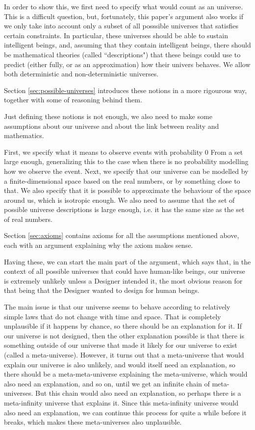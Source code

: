 \documentclass[a4paper
]{article}
\newcommand{\ghilimele}[1]{``#1"}
\begin{document}
In order to show this, we first need to specify what would count as an universe.
This is a difficult question, but, fortunately, this paper's argument also works
if we only take into account only a subset of all posssible universes that
satisfies certain constraints.
In particular, these universes should be able to sustain intelligent beings,
and, assuming that they contain intelligent beings, there should be mathematical
theories (called \ghilimele{descriptions}) that these beings could use to predict
(either fully, or as an approximation) how their univers behaves.
We allow both deterministic and non-deterministic universes.

Section \ref{sec:possible-universes} introduces these notions in a more
rigourous way, together with some of reasoning behind them.

Just defining these notions is not enough,
we also need to make some assumptions about our universe and about
the link between reality and mathematics.

First, we specify what it means to observe events with probability $0$ From
a set large enough, generalizing this to the case when there is no probability
modelling how we observe the event.
Next, we specify that our universe can be modelled by a finite-dimensional
space based on the real numbers, or by something close to that.
We also specify that it is possible to approximate the behaviour of the space
around us, which is isotropic enough.
We also need to assume that the set of possible universe descriptions
is large enough, i.e. it has the same size as the set of real numbers.

Section \ref{sec:axioms} contains axioms for all the assumptions mentioned
above, each with an argument explaining why the axiom makes sense.

Having these, we can start the main part of the argument,
which says that, in the context of all possible universes that could
have human-like beings, our universe is extremely unlikely unless a Designer
intended it, the most obvious reason for that being that the Designer wanted
to design for human beings.

The main issue is that our universe seems to behave according to relatively
simple laws that do not change with time and space.
That is completely
unplausible if it happens by chance, so there should be an explanation for it.
If our universe is not designed, then the other explanation possible is that
there is something outside of our universe that made it likely for our universe
to exist (called a meta-universe).
However, it turns out that a meta-universe that
would explain our universe is also unlikely, and would itself need an
explanation, so there should be a meta-meta-universe explaining the
meta-universe, which would also need an
explanation, and so on, until we get an infinite chain of meta-universes.
But this chain would also need an explanation, so perhaps there is a
meta-infinity universe that explains it.
Since this meta-infinity universe would also need an explanation, we can
continue this process for quite a while before it breaks,
which makes these meta-universes also unplausible.
\end{document}
